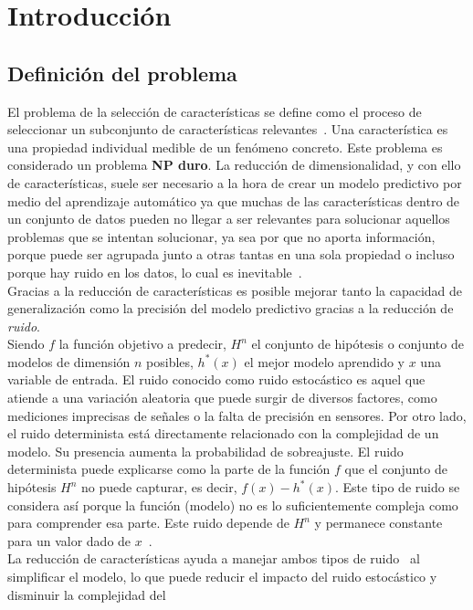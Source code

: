 \chapter{Introducción}
\section{Definición del problema}
El problema de la selección de características se define como el proceso de
seleccionar un subconjunto de características relevantes~\cite{miao_survey_2016}. Una característica es
una propiedad individual medible de un fenómeno concreto. Este problema es
considerado un problema \textbf{NP duro}. La reducción de dimensionalidad, y con
ello de características, suele ser necesario a la hora de crear un modelo predictivo por medio
del aprendizaje automático ya que muchas de las características
dentro de un conjunto de datos pueden no llegar a ser relevantes para solucionar
aquellos problemas que se intentan solucionar, ya sea por que no aporta información,
porque puede ser agrupada junto a otras tantas en una sola propiedad o incluso porque hay ruido
en los datos, lo cual es inevitable~\cite{Mostafa2012}.\\[6pt]
Gracias a la reducción de características es posible mejorar tanto la capacidad de generalización
como la precisión del modelo predictivo gracias a la reducción de \textit{ruido}.\\[6pt]
Siendo $f$ la función objetivo a predecir, $H^n$ el conjunto de hipótesis o conjunto de modelos
de dimensión $n$ posibles, $h^*(x)$ el mejor modelo aprendido y $x$ una variable de entrada. El ruido conocido
como ruido estocástico es aquel que atiende a una variación aleatoria que
puede surgir de diversos factores, como mediciones imprecisas de señales o la falta de
precisión en sensores. Por otro lado, el ruido determinista está directamente
relacionado con la complejidad de un modelo. Su presencia aumenta la probabilidad de
sobreajuste. El ruido determinista puede explicarse como la parte de la función $f$ que el conjunto
de hipótesis $H^n$ no puede capturar, es decir, $f(x) - h^*(x)$. Este tipo de ruido se
considera así porque la función (modelo) no es lo suficientemente compleja como para comprender
esa parte. Este ruido depende de $H^n$ y permanece constante para un valor dado de $x$~\cite{Mostafa2012}.\\[6pt]
La reducción de características ayuda a manejar ambos tipos de ruido~\cite{miao_survey_2016,Mostafa2012} al simplificar el
modelo, lo que puede reducir el impacto del ruido estocástico y disminuir la complejidad del
